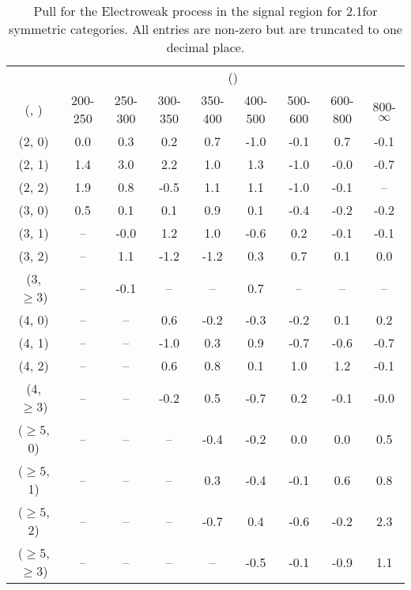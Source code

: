 \begin{table}[h!]
\tiny
\centering
\caption{Pull for the Electroweak process in the signal region for 2.1\ifb for symmetric categories. All entries are non-zero but are truncated to one decimal place.\label{tab:pullsepnaive_sig_ewk_sym}}
\begin{tabular}
{ccccccccc}
	\hline\hline
	& \multicolumn{8}{c}{\scalht (\gev)} \\ 
	 (\njet,  \nb) & 200-250 & 250-300 & 300-350 & 350-400 & 400-500 & 500-600 & 600-800 & 800-$\infty$ \\ [0.8ex] 
\hline
	(2, 0) & 0.0 & 0.3 & 0.2 & 0.7 & -1.0 & -0.1 & 0.7 & -0.1 \\[0.5ex] 
	(2, 1) & 1.4 & 3.0 & 2.2 & 1.0 & 1.3 & -1.0 & -0.0 & -0.7 \\[0.5ex] 
	(2, 2) & 1.9 & 0.8 & -0.5 & 1.1 & 1.1 & -1.0 & -0.1 & -- \\[0.5ex] 
	(3, 0) & 0.5 & 0.1 & 0.1 & 0.9 & 0.1 & -0.4 & -0.2 & -0.2 \\[0.5ex] 
	(3, 1) & -- & -0.0 & 1.2 & 1.0 & -0.6 & 0.2 & -0.1 & -0.1 \\[0.5ex] 
	(3, 2) & -- & 1.1 & -1.2 & -1.2 & 0.3 & 0.7 & 0.1 & 0.0 \\[0.5ex] 
	(3, $\ge3$) & -- & -0.1 & -- & -- & 0.7 & -- & -- & -- \\[0.5ex] 
	(4, 0) & -- & -- & 0.6 & -0.2 & -0.3 & -0.2 & 0.1 & 0.2 \\[0.5ex] 
	(4, 1) & -- & -- & -1.0 & 0.3 & 0.9 & -0.7 & -0.6 & -0.7 \\[0.5ex] 
	(4, 2) & -- & -- & 0.6 & 0.8 & 0.1 & 1.0 & 1.2 & -0.1 \\[0.5ex] 
	(4, $\ge3$) & -- & -- & -0.2 & 0.5 & -0.7 & 0.2 & -0.1 & -0.0 \\[0.5ex] 
	($\ge5$, 0) & -- & -- & -- & -0.4 & -0.2 & 0.0 & 0.0 & 0.5 \\[0.5ex] 
	($\ge5$, 1) & -- & -- & -- & 0.3 & -0.4 & -0.1 & 0.6 & 0.8 \\[0.5ex] 
	($\ge5$, 2) & -- & -- & -- & -0.7 & 0.4 & -0.6 & -0.2 & 2.3 \\[0.5ex] 
	($\ge5$, $\ge3$) & -- & -- & -- & -- & -0.5 & -0.1 & -0.9 & 1.1 \\[0.5ex] 
	\hline
	\hline
\end{tabular}
\end{table}
